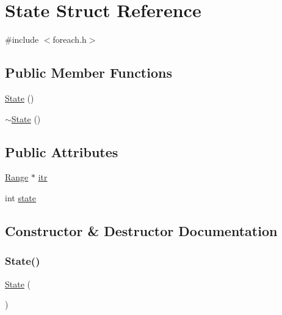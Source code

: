 \hypertarget{struct__fe_1_1State}{}\section{State Struct Reference}
\label{struct__fe_1_1State}


{\ttfamily \#include $<$foreach.\+h$>$}

\subsection*{Public Member Functions}
\begin{DoxyCompactItemize}
\item 
\mbox{\hyperlink{struct__fe_1_1State_a790355057d12e9c1ce7643551c16fecd}{State}} ()
\item 
\mbox{\hyperlink{struct__fe_1_1State_a6852634c51e30fa7d2c00556fb8e1fad}{$\sim$\+State}} ()
\end{DoxyCompactItemize}
\subsection*{Public Attributes}
\begin{DoxyCompactItemize}
\item 
\mbox{\hyperlink{struct__fe_1_1Range}{Range}} $\ast$ \mbox{\hyperlink{struct__fe_1_1State_a74a1a618dd341a96ce256115a6055b80}{itr}}
\item 
int \mbox{\hyperlink{struct__fe_1_1State_a89f234133d3efe315836311cbf21c64b}{state}}
\end{DoxyCompactItemize}


\subsection{Constructor \& Destructor Documentation}
\mbox{\label{struct__fe_1_1State_a790355057d12e9c1ce7643551c16fecd}} 
\subsubsection{\texorpdfstring{State()}{State()}}
{\footnotesize\ttfamily \mbox{\hyperlink{struct__fe_1_1State}{State}} (\begin{DoxyParamCaption}{ }\end{DoxyParamCaption})\hspace{0.3cm}{\ttfamily [inline]}}

